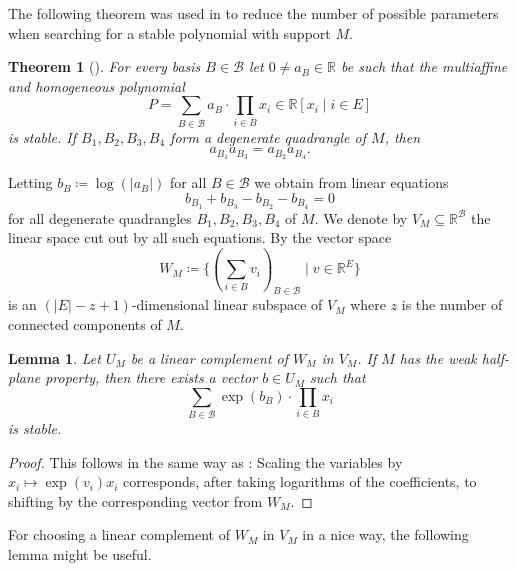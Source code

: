 \documentclass[11pt]{article}
\newtheorem{thm}[theo]{Theorem}
\newtheorem{lem}[theo]{Lemma}
\theoremstyle{definition}
\numberwithin{equation}{section}
\newcommand{\R}{{\mathbb R}}
\newcommand{\cB}{{\mathcal B}}
\begin{document}
The following theorem was used in \cite{BrandenDLeon} to reduce the number of possible parameters when searching for a stable polynomial with support $M$.

\begin{thm}[\cite{BrandenHPP}]\label{thm:degQuadCoeffs}
    For every basis $B\in\cB$ let $0\neq a_B\in\R$ be such that the multiaffine and homogeneous polynomial
    \begin{equation*}
        P=\sum_{B\in\cB}a_{B}\cdot\prod_{i\in B}x_i\in\R[x_i\mid i\in E]
    \end{equation*}
    is stable. If $B_1,B_2,B_3,B_4$ form a degenerate quadrangle of $M$, then
    \begin{equation}\label{eq:deg4}
      a_{B_1}a_{B_3}=a_{B_2}a_{B_4}.  
    \end{equation}
\end{thm}
 Letting $b_B\coloneqq \log(|a_B|)$ for all $B\in\cB$ we obtain from  linear equations
 \begin{equation*}
  b_{B_1}+b_{B_3}-b_{B_2}-b_{B_4}=0   
 \end{equation*}
for all degenerate quadrangles $B_1,B_2,B_3,B_4$ of $M$. We denote by $V_M\subseteq\R^{\cB}$ the linear space cut out by all such equations. By \cite[Lemma~2.6]{BrandenDLeon} the vector space
\begin{equation*}
  W_M\coloneqq \{(\sum_{i\in B}v_i)_{B\in\cB}\mid v\in\R^E\}  
\end{equation*}
is an $(|E|-z+1)$-dimensional linear subspace of $V_M$ where $z$ is the number of connected components of $M$.

\begin{lem}\label{lem:rescale}
    Let $U_M$ be a linear complement of $W_M$ in $V_M$. If $M$ has the weak half-plane property, then there exists a vector $b\in U_M$ such that
    \begin{equation*}
        \sum_{B\in\cB}\exp(b_{B})\cdot\prod_{i\in B}x_i
    \end{equation*}
    is stable.
\end{lem}

\begin{proof}
    This follows in the same way as \cite[Theorem~2.3]{BrandenDLeon}: Scaling the variables by $x_i\mapsto\exp(v_i)x_i$ corresponds, after taking logarithms of the coefficients, to shifting by the corresponding vector from $W_M$.
\end{proof}

For choosing a linear complement of $W_M$ in $V_M$ in a nice way, the following lemma might be useful.
\end{document}
